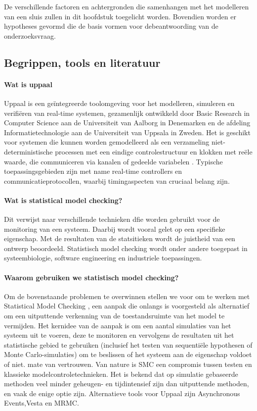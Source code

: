 \documentclass{article}
\begin{document}
	De verschillende factoren en achtergronden die  samenhangen met het modelleren van een sluis zullen in dit hoofdstuk toegelicht worden. Bovendien worden er hypotheses gevormd die de basis vormen voor debeantwoording van de onderzoeksvraag. 
	
	\subsection{Begrippen, tools en literatuur}
	
	\paragraph{Wat is uppaal}
	Uppaal is een geïntegreerde toolomgeving voor het modelleren, simuleren en verifiëren van real-time systemen, gezamenlijk ontwikkeld door Basic Research in Computer Science aan de Universiteit van Aalborg in Denemarken en de afdeling Informatietechnologie aan de Universiteit van Uppsala in Zweden. Het is geschikt voor systemen die kunnen worden gemodelleerd als een verzameling niet-deterministische processen met een eindige controlestructuur en klokken met reële waarde, die communiceren via kanalen of gedeelde variabelen . Typische toepassingsgebieden zijn met name real-time controllers en communicatieprotocollen, waarbij timingaspecten van cruciaal belang zijn. %
	
	\paragraph{Wat is statistical model checking?}
	Dit verwijst naar verschillende technieken dfie worden gebruikt voor de monitoring van een systeem. Daarbij wordt vooral gelet op een specifieke eigenschap. Met de resultaten van de statsitieken wordt de juistheid van een ontwerp beoordeeld. Statistisch model checking wordt onder andere toegepast in systeembiologie, software engineering en industriele toepassingen.
	\cite{inriaStatsMoodCheck}
	\cite{ buddeModelChecker}
	
	\paragraph{Waarom gebruiken we statistisch model checking?}
	Om de bovenstaande problemen te overwinnen stellen we voor om te werken met Statistical Model Checking , een aanpak die onlangs is voorgesteld als alternatief om een uitputtende verkenning van de toestandsruimte van het model te vermijden. Het kernidee van de aanpak is om een aantal simulaties van het systeem uit te voeren, deze te monitoren en vervolgens de resultaten uit het statistische gebied te gebruiken (inclusief het testen van sequentiële hypothesen of Monte Carlo-simulaties) om te beslissen of het systeem aan de eigenschap voldoet of niet. mate van vertrouwen. Van nature is SMC een compromis tussen testen en klassieke modelcontroletechnieken. Het is bekend dat op simulatie gebaseerde methoden veel minder geheugen- en tijdintensief zijn dan uitputtende methoden, en vaak de enige optie zijn.
	\cite{inriaStatsMoodCheck}Alternatieve tools voor Uppaal zijn Asynchronous Events,Vesta en MRMC.
	
\end{document}
